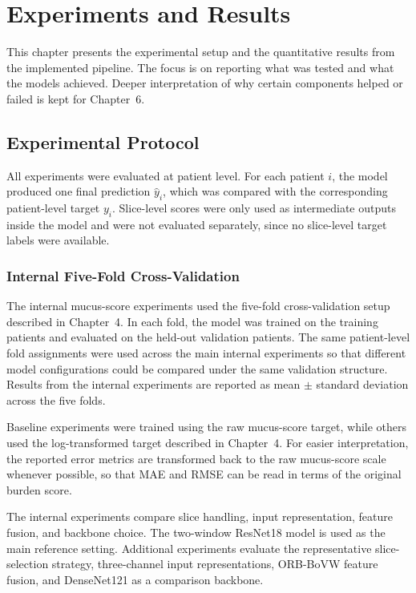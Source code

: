 \chapter{Experiments and Results}
\label{sec:experiments_and_results}

This chapter presents the experimental setup and the quantitative results from the implemented pipeline. The focus is on reporting what was tested and what the models achieved. Deeper interpretation of why certain components helped or failed is kept for Chapter~6.


\section{Experimental Protocol}
\label{sec:experimental_protocol}

All experiments were evaluated at patient level. For each patient \(i\), the model produced one final prediction \(\hat{y}_i\), which was compared with the corresponding patient-level target \(y_i\). Slice-level scores were only used as intermediate outputs inside the model and were not evaluated separately, since no slice-level target labels were available.


\subsection{Internal Five-Fold Cross-Validation}
\label{sec:internal_five_fold_cv_results}

The internal mucus-score experiments used the five-fold cross-validation setup described in Chapter~4. In each fold, the model was trained on the training patients and evaluated on the held-out validation patients. The same patient-level fold assignments were used across the main internal experiments so that different model configurations could be compared under the same validation structure. Results from the internal experiments are reported as mean \(\pm\) standard deviation across the five folds.

Baseline experiments were trained using the raw mucus-score target, while others used the log-transformed target described in Chapter~4. For easier interpretation, the reported error metrics are transformed back to the raw mucus-score scale whenever possible, so that MAE and RMSE can be read in terms of the original burden score.

The internal experiments compare slice handling, input representation, feature fusion, and backbone choice. The two-window ResNet18 model is used as the main reference setting. Additional experiments evaluate the representative slice-selection strategy, three-channel input representations, ORB-BoVW feature fusion, and DenseNet121 as a comparison backbone.


